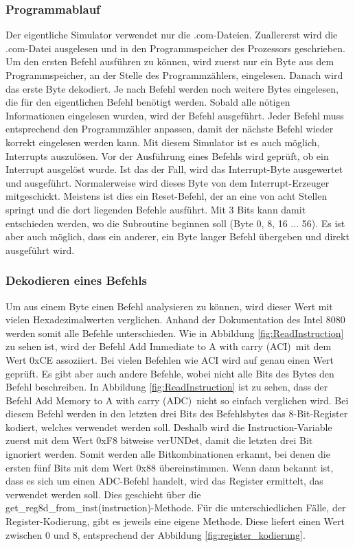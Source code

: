 \documentclass[12pt]{article}
\newcommand{\imgSpaceBefore}{\vspace{10pt}}
\begin{document}
\subsubsection{Programmablauf}
Der eigentliche Simulator verwendet nur die .com-Dateien. Zuallererst wird die .com-Datei ausgelesen und in den Programmspeicher des Prozessors geschrieben. Um den ersten Befehl ausführen zu können, wird zuerst nur ein Byte aus dem Programmspeicher, an der Stelle des Programmzählers, eingelesen. Danach wird das erste Byte dekodiert.
Je nach Befehl werden noch weitere Bytes eingelesen, die für den eigentlichen Befehl benötigt werden. Sobald alle nötigen Informationen eingelesen wurden, wird der Befehl ausgeführt. Jeder Befehl muss entsprechend den Programmzähler anpassen, damit der nächste Befehl wieder korrekt eingelesen werden kann. Mit diesem Simulator ist es auch möglich, Interrupts auszulösen. Vor der Ausführung eines Befehls wird geprüft, ob ein Interrupt ausgelöst wurde. Ist das der Fall, wird das Interrupt-Byte ausgewertet und ausgeführt. Normalerweise wird dieses Byte von dem Interrupt-Erzeuger mitgeschickt. Meistens ist dies ein Reset-Befehl, der an eine von acht Stellen springt und die dort liegenden Befehle ausführt. Mit 3 Bits kann damit entschieden werden, wo die Subroutine beginnen soll (Byte 0, 8, 16 ... 56). Es ist aber auch möglich, dass ein anderer, ein Byte langer Befehl übergeben und direkt ausgeführt wird.


\subsubsection{Dekodieren eines Befehls}
\noindent
Um aus einem Byte einen Befehl analysieren zu können, wird dieser Wert mit vielen Hexadezimalwerten verglichen. Anhand der Dokumentation des Intel 8080 werden somit alle Befehle unterschieden.
Wie in  Abbildung \ref{fig:ReadInstruction} zu sehen ist, wird der Befehl \glqq Add Immediate to A with carry (ACI)\grqq\ mit dem Wert 0xCE assoziiert.
Bei vielen Befehlen wie ACI wird auf genau einen Wert geprüft. Es gibt aber auch andere Befehle, wobei nicht alle Bits des Bytes den Befehl beschreiben. In Abbildung \ref{fig:ReadInstruction} ist zu sehen, dass der Befehl \glqq Add Memory to A with carry (ADC)\grqq\ nicht so einfach verglichen wird. Bei diesem Befehl werden in den letzten drei Bits des Befehlsbytes das 8-Bit-Register kodiert, welches verwendet werden soll. Deshalb wird die Instruction-Variable zuerst mit dem Wert 0xF8 bitweise verUNDet, damit die letzten drei Bit ignoriert werden. Somit werden alle Bitkombinationen erkannt, bei denen die ersten fünf Bits mit dem Wert 0x88 übereinstimmen. Wenn dann bekannt ist, dass es sich um einen ADC-Befehl handelt, wird das Register ermittelt, das verwendet werden soll. Dies geschieht über die get\_reg8d\_from\_inst(instruction)-Methode. Für die unterschiedlichen Fälle, der Register-Kodierung, gibt es jeweils eine eigene Methode. Diese liefert einen Wert zwischen 0 und 8, entsprechend der Abbildung \ref{fig:register_kodierung}.\imgSpaceBefore
\end{document}
